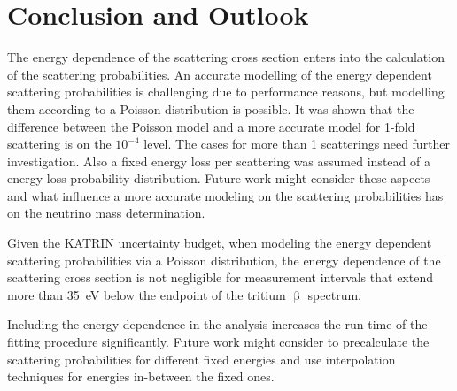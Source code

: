 \section{Conclusion and Outlook}
The energy dependence of the scattering cross section enters into the calculation of the scattering probabilities. An accurate modelling of the energy dependent scattering probabilities is challenging due to performance reasons, but modelling them according to a Poisson distribution is possible. It was shown that the difference between the Poisson model and a more accurate model for 1-fold scattering is on the $10^{-4}$ level. The cases for more than 1 scatterings need further investigation. Also a fixed energy loss per scattering was assumed instead of a energy loss probability distribution. Future work might consider these aspects and what influence a more accurate modeling on the scattering probabilities has on the neutrino mass determination.

Given the KATRIN uncertainty budget, when modeling the energy dependent scattering probabilities via a Poisson distribution, the energy dependence of the scattering cross section is not negligible for measurement intervals that extend more than \SI{35}{eV} below the endpoint of the tritium $\upbeta$ spectrum.

Including the energy dependence in the analysis increases the run time of the fitting procedure significantly. Future work might consider to precalculate the scattering probabilities for different fixed energies and use interpolation techniques for energies in-between the fixed ones.